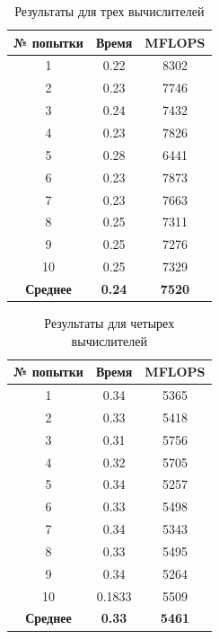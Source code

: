 \begin{table}[H]
	\caption{Результаты для трех вычислителей}
	\centering
	\begin{tabular}{|c|c|c|}
		\hline
		\textbf{№ попытки} & \textbf{Время} & \textbf{MFLOPS} \\\hline
		1 & 0.22 & 8302 \\ \hline
		2 & 0.23 & 7746 \\ \hline
		3 & 0.24 & 7432 \\ \hline
		4 & 0.23 & 7826 \\ \hline
		5 & 0.28 & 6441 \\ \hline
		6 & 0.23 & 7873 \\ \hline
		7 & 0.23 & 7663 \\ \hline
		8 & 0.25 & 7311 \\ \hline
		9 & 0.25 & 7276 \\ \hline
		10 & 0.25 & 7329 \\ \hline
		\textbf{Среднее} & \textbf{0.24} & \textbf{7520} \\\hline
	\end{tabular}
	\label{res/03}
\end{table}


\begin{table}[H]
		\caption{Результаты для четырех вычислителей}
	\centering
	\begin{tabular}{|c|c|c|}
		\hline
		\textbf{№ попытки} & \textbf{Время} & \textbf{MFLOPS} \\\hline
		1 & 0.34 & 5365 \\ \hline
		2 & 0.33 & 5418 \\ \hline
		3 & 0.31 & 5756 \\ \hline
		4 & 0.32 & 5705 \\ \hline
		5 & 0.34 & 5257 \\ \hline
		6 & 0.33 & 5498 \\ \hline
		7 & 0.34 & 5343 \\ \hline
		8 & 0.33 & 5495 \\ \hline
		9 & 0.34 & 5264 \\ \hline
		10 & 0.1833 & 5509 \\ \hline
		\textbf{Среднее} & \textbf{0.33} & \textbf{5461} \\\hline
	\end{tabular}
	\label{res/04}
\end{table}


